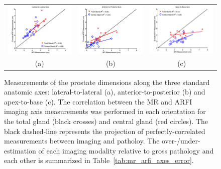 \begin{figure}[htb!]
\centering
\begin{tabular}{ccc}
\includegraphics[width=0.3\linewidth]{figs/Imaging_Lateral-to-Lateral} &
\includegraphics[width=0.3\linewidth]{figs/Imaging_Anterior-to-Posterior} &
\includegraphics[width=0.3\linewidth]{figs/Imaging_Apex-to-Base} \\
(a) & (b) & (c) \\
\end{tabular}
\caption{Measurements of the prostate dimensions along the three standard
    anatomic axes: lateral-to-lateral (a), anterior-to-posterior (b) and
    apex-to-base (c).  The correlation between the MR and ARFI imaging axis
    measurements was performed in each orientation for the total gland (black
    crosses) and central gland (red circles).  The black dashed-line represents
    the projection of perfectly-correlated measurements between imaging and
    patholoy.  The over-/under-estimation of each imaging modality relative to
    gross pathology and each other is summarized in
    Table~\ref{tab:mr_arfi_axes_error}.} 
\label{fig:mr_arfi_path_axes}
\end{figure}

